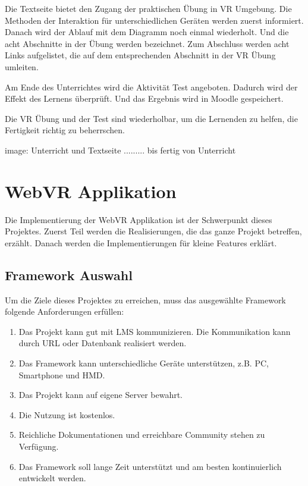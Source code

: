  Die Textseite bietet den Zugang der praktischen Übung in VR Umgebung. Die Methoden der Interaktion für unterschiedlichen Geräten werden zuerst informiert. Danach wird der Ablauf mit dem Diagramm noch einmal wiederholt. Und die acht Abschnitte in der Übung werden bezeichnet. Zum Abschluss werden acht Links aufgelistet, die auf dem entsprechenden Abschnitt in der VR Übung umleiten.
 
 Am Ende des Unterrichtes wird die Aktivität Test angeboten. Dadurch wird der Effekt des Lernens überprüft. Und das Ergebnis wird in Moodle gespeichert.
 
 Die VR Übung und der Test sind wiederholbar, um die Lernenden zu helfen, die Fertigkeit richtig zu beherrschen.
 
 image: Unterricht und Textseite ......... bis fertig von Unterricht
 
\section{WebVR Applikation}
Die Implementierung der WebVR Applikation ist der Schwerpunkt dieses Projektes. Zuerst Teil werden die Realisierungen, die das ganze Projekt betreffen, erzählt. Danach werden die Implementierungen für kleine Features erklärt.

 \subsection{Framework Auswahl}
 
 Um die Ziele dieses Projektes zu erreichen, muss das ausgewählte Framework folgende Anforderungen erfüllen:
 
 \begin{enumerate}
     \item Das Projekt kann gut mit LMS kommunizieren. Die Kommunikation kann durch URL oder Datenbank realisiert werden.
     \item Das Framework kann unterschiedliche Geräte unterstützen, z.B. PC, Smartphone und HMD.
     \item Das Projekt kann auf eigene Server bewahrt.
     \item Die Nutzung ist kostenlos.
     \item Reichliche Dokumentationen und erreichbare Community stehen zu Verfügung.
     \item Das Framework soll lange Zeit unterstützt und am besten kontinuierlich entwickelt werden.
 \end{enumerate}
 
